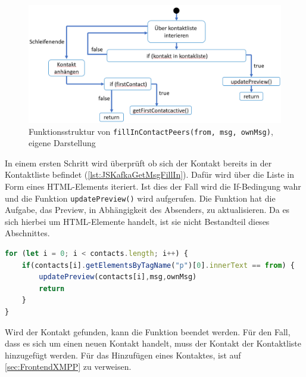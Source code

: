 \documentclass[a4paper,titlepage,halfparskip,12pt]{scrreprt}
\begin{document}
\begin{onehalfspacing}
\begin{figure}[h]
	\centering
	\includegraphics[scale=0.6]{images/fillInContactPeersKafka}
	\caption{Funktionsstruktur von \texttt{fillInContactPeers(from, msg, ownMsg)}, eigene Darstellung}
	\label{img:fillInContactPeersKafka}
\end{figure}
In einem ersten Schritt wird überprüft ob sich der Kontakt bereits in der Kontaktliste befindet (\autoref{lst:JSKafkaGetMsgFillIn}). Dafür wird über die Liste in Form eines HTML-Elements iteriert. Ist dies der Fall wird die If-Bedingung wahr und die Funktion \texttt{updatePreview()} wird aufgerufen. Die Funktion hat die Aufgabe, das Preview, in Abhängigkeit des Absenders, zu aktualisieren. Da es sich hierbei um HTML-Elemente handelt, ist sie nicht Bestandteil dieses Abschnittes.
\begin{lstlisting}[language=Javascript,caption=Überprüfung ob der Kontakt bereits in der Liste ist,label={lst:JSKafkaGetMsgFillIn}]
for (let i = 0; i < contacts.length; i++) {
	if(contacts[i].getElementsByTagName("p")[0].innerText == from) {
		updatePreview(contacts[i],msg,ownMsg)
		return
	} 
}
\end{lstlisting}
Wird der Kontakt gefunden, kann die Funktion beendet werden. Für den Fall, dass es sich um einen neuen Kontakt handelt, muss der Kontakt der Kontaktliste hinzugefügt werden. Für das Hinzufügen eines Kontaktes, ist auf \autoref{sec:FrontendXMPP} zu verweisen.\\

\end{onehalfspacing}
\end{document}
